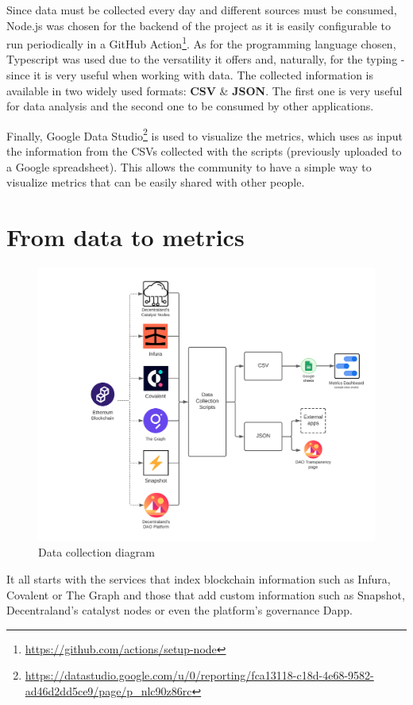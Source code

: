 \documentclass[MSE,Master,english]{twbook}%
\begin{document}
Since data must be collected every day and different sources must be consumed, Node.js was chosen for the backend of the project as it is easily configurable to run periodically in a GitHub Action\footnote{\url{https://github.com/actions/setup-node}}. As for the programming language chosen, Typescript was used due to the versatility it offers and, naturally, for the typing - since it is very useful when working with data. The collected information is available in two widely used formats: \textbf{CSV} \& \textbf{JSON}. The first one is very useful for data analysis and the second one to be consumed by other applications.

Finally, Google Data Studio\footnote{\url{https://datastudio.google.com/u/0/reporting/fca13118-c18d-4e68-9582-ad46d2dd5ce9/page/p_nlc90z86rc}} is used to visualize the metrics, which uses as input the information from the CSVs collected with the scripts (previously uploaded to a Google spreadsheet). This allows the community to have a simple way to visualize metrics that can be easily shared with other people.

\section{From data to metrics}
\begin{figure}[H]
  \centering
  \includegraphics[width=\textwidth]{diagrama.png}
  \caption{Data collection diagram}
  \label{fig:diagram}
\end{figure}

It all starts with the services that index blockchain information such as Infura, Covalent or The Graph and those that add custom information such as Snapshot, Decentraland's catalyst nodes or even the platform's governance Dapp.
\end{document}
